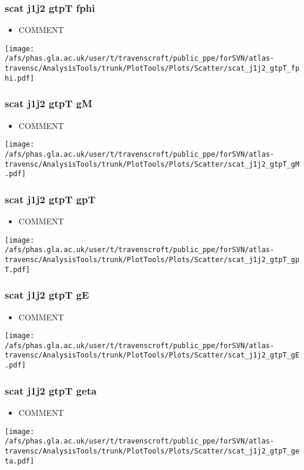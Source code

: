 \documentclass{beamer}
\begin{document}
\begin{frame}
\frametitle{scat j1j2 gtpT fphi}
\begin{itemize}
\item COMMENT
\end{itemize}
\begin{center}
\texttt{[image: /afs/phas.gla.ac.uk/user/t/travenscroft/public\_ppe/forSVN/atlas-travensc/AnalysisTools/trunk/PlotTools/Plots/Scatter/scat\_j1j2\_gtpT\_fphi.pdf]}
\end{center}
\end{frame}

\begin{frame}
\frametitle{scat j1j2 gtpT gM}
\begin{itemize}
\item COMMENT
\end{itemize}
\begin{center}
\texttt{[image: /afs/phas.gla.ac.uk/user/t/travenscroft/public\_ppe/forSVN/atlas-travensc/AnalysisTools/trunk/PlotTools/Plots/Scatter/scat\_j1j2\_gtpT\_gM.pdf]}
\end{center}
\end{frame}

\begin{frame}
\frametitle{scat j1j2 gtpT gpT}
\begin{itemize}
\item COMMENT
\end{itemize}
\begin{center}
\texttt{[image: /afs/phas.gla.ac.uk/user/t/travenscroft/public\_ppe/forSVN/atlas-travensc/AnalysisTools/trunk/PlotTools/Plots/Scatter/scat\_j1j2\_gtpT\_gpT.pdf]}
\end{center}
\end{frame}

\begin{frame}
\frametitle{scat j1j2 gtpT gE}
\begin{itemize}
\item COMMENT
\end{itemize}
\begin{center}
\texttt{[image: /afs/phas.gla.ac.uk/user/t/travenscroft/public\_ppe/forSVN/atlas-travensc/AnalysisTools/trunk/PlotTools/Plots/Scatter/scat\_j1j2\_gtpT\_gE.pdf]}
\end{center}
\end{frame}

\begin{frame}
\frametitle{scat j1j2 gtpT geta}
\begin{itemize}
\item COMMENT
\end{itemize}
\begin{center}
\texttt{[image: /afs/phas.gla.ac.uk/user/t/travenscroft/public\_ppe/forSVN/atlas-travensc/AnalysisTools/trunk/PlotTools/Plots/Scatter/scat\_j1j2\_gtpT\_geta.pdf]}
\end{center}
\end{frame}
\end{document}
